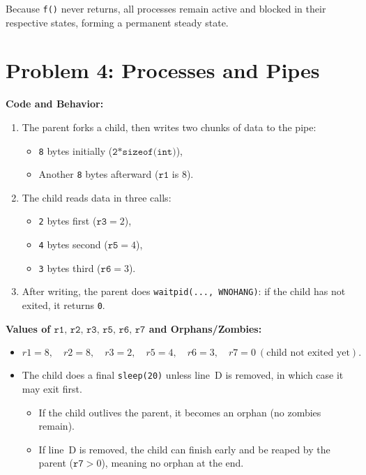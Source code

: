 \documentclass[11pt]{article}
\begin{document}
	Because \texttt{f()} never returns, all processes remain active and blocked in their respective states, forming a permanent steady state.
	
	\section*{Problem 4: Processes and Pipes}
	
	\noindent
	\textbf{Code and Behavior:}
	\begin{enumerate}
		\item The parent forks a child, then writes two chunks of data to the pipe:
		\begin{itemize}
			\item \texttt{8} bytes initially (\(\texttt{2*sizeof(int)}\)),
			\item Another \texttt{8} bytes afterward (\(\texttt{r1}\) is 8).
		\end{itemize}
		\item The child reads data in three calls:
		\begin{itemize}
			\item \texttt{2} bytes first (\(\texttt{r3} = 2\)),
			\item \texttt{4} bytes second (\(\texttt{r5} = 4\)),
			\item \texttt{3} bytes third (\(\texttt{r6} = 3\)).
		\end{itemize}
		\item After writing, the parent does \texttt{waitpid(..., WNOHANG)}: if the child has not exited, it returns \texttt{0}. 
	\end{enumerate}
	
	\noindent
	\textbf{Values of \(\texttt{r1, r2, r3, r5, r6, r7}\) and Orphans/Zombies:}
	\begin{itemize}
		\item 
		\[
		r1 = 8, \quad
		r2 = 8, \quad
		r3 = 2, \quad
		r5 = 4, \quad
		r6 = 3, \quad
		r7 = 0 \ (\text{child not exited yet}).
		\]
		\item The child does a final \texttt{sleep(20)} unless line~D is removed, in which case it may exit first. 
		\begin{itemize}
			\item If the child outlives the parent, it becomes an orphan (no zombies remain).
			\item If line~D is removed, the child can finish early and be reaped by the parent (\(\texttt{r7}>0\)), meaning no orphan at the end.
		\end{itemize}
	\end{itemize}
	
\end{document}
